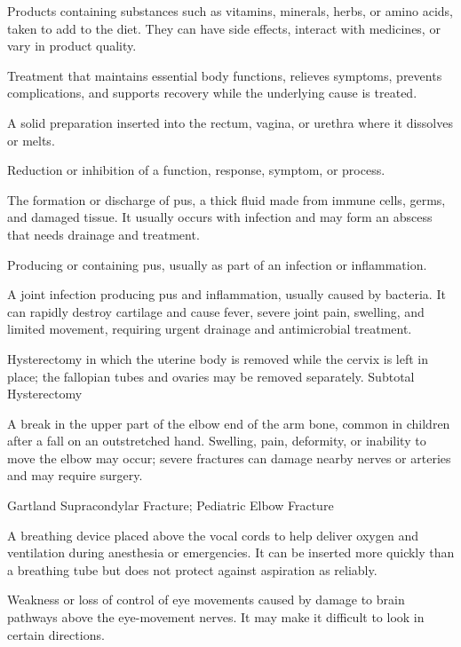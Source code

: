  Products containing substances such as vitamins, minerals, herbs, or amino acids, taken to add to the diet. They can have side effects, interact with medicines, or vary in product quality.

 Treatment that maintains essential body functions, relieves symptoms, prevents complications, and supports recovery while the underlying cause is treated.

 A solid preparation inserted into the rectum, vagina, or urethra where it dissolves or melts.

 Reduction or inhibition of a function, response, symptom, or process.

 The formation or discharge of pus, a thick fluid made from immune cells, germs, and damaged tissue. It usually occurs with infection and may form an abscess that needs drainage and treatment.

 Producing or containing pus, usually as part of an infection or inflammation.

 A joint infection producing pus and inflammation, usually caused by bacteria. It can rapidly destroy cartilage and cause fever, severe joint pain, swelling, and limited movement, requiring urgent drainage and antimicrobial treatment.

 Hysterectomy in which the uterine body is removed while the cervix is left in place; the fallopian tubes and ovaries may be removed separately.
\synonyms
Subtotal Hysterectomy

 A break in the upper part of the elbow end of the arm bone, common in children after a fall on an outstretched hand. Swelling, pain, deformity, or inability to move the elbow may occur; severe fractures can damage nearby nerves or arteries and may require surgery.

\synonyms
Gartland Supracondylar Fracture; Pediatric Elbow Fracture

 A breathing device placed above the vocal cords to help deliver oxygen and ventilation during anesthesia or emergencies. It can be inserted more quickly than a breathing tube but does not protect against aspiration as reliably.

 Weakness or loss of control of eye movements caused by damage to brain pathways above the eye-movement nerves. It may make it difficult to look in certain directions.

